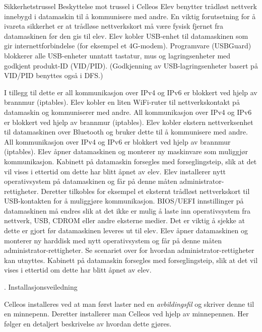 Sikkerhetstrussel	Beskyttelse mot trussel i Celleos
Elev benytter tr\aa dl\o st nettverk innebygd i datamaskin til \aa{} kommunisere med andre.	En viktig forutsetning for \aa{} ivareta sikkerhet er at tr\aa dl\o se nettverkskort m\aa{} v\ae re fysisk fjernet fra datamaskinen f\o r den gis til elev.
Elev kobler USB-enhet til datamaskinen som gir internettforbindelse (for eksempel et 4G-modem).	Programvare (USBGuard) blokkerer alle USB-enheter unntatt tastatur, mus og lagringsenheter med godkjent produkt-ID (VID/PID). (Godkjenning av USB-lagringsenheter basert p\aa{} VID/PID benyttes ogs\aa{} i DFS.)

I tillegg til dette er all kommunikasjon over IPv4 og IPv6 er blokkert ved hjelp av brannmur (iptables).
Elev kobler en liten WiFi-ruter til nettverkskontakt p\aa{} datamaskin og kommuniserer med andre.	All kommunikasjon over IPv4 og IPv6 er blokkert ved hjelp av brannmur (iptables).
Elev kobler ekstern nettverksenhet til datamaskinen over Bluetooth og bruker dette til \aa{} kommunisere med andre.	All kommunikasjon over IPv4 og IPv6 er blokkert ved hjelp av brannmur (iptables).
Elev \aa pner datamaskinen og monterer ny maskinvare som muliggj\o r kommunikasjon.	Kabinett p\aa{} datamaskin forsegles med forseglingsteip, slik at det vil vises i ettertid om dette har blitt \aa pnet av elev.
Elev installerer nytt operativsystem p\aa{} datamaskinen og f\aa r p\aa{} denne m\aa ten administrator-rettigheter. Deretter tilkobles for eksempel et eksternt tr\aa dl\o st nettverkskort til USB-kontakten for \aa{} muliggj\o re kommunikasjon.	BIOS/UEFI innstillinger p\aa{} datamaskinen m\aa{} endres slik at det ikke er mulig \aa{} laste inn operativsystem fra nettverk, USB, CDROM eller andre eksterne medier. Det er viktig \aa{} sjekke at dette er gjort f\o r datamaskinen leveres ut til elev.
Elev \aa pner datamaskinen og monterer ny harddisk med nytt operativsystem og f\aa r p\aa{} denne m\aa ten administrator-rettigheter. Se scenariet over for hvordan administrator-rettigheter kan utnyttes.	Kabinett p\aa{} datamaskin forsegles med forseglingsteip, slik at det vil vises i ettertid om dette har blitt \aa pnet av elev.



. Installasjonsveiledning

Celleos installeres ved at man f\o rst laster ned en {\it avbildingsfil} og skriver denne til en minnepenn. Deretter installerer man Celleos ved hjelp av minnepennen. Her f\o lger en detaljert beskrivelse av hvordan dette gj\o res.

